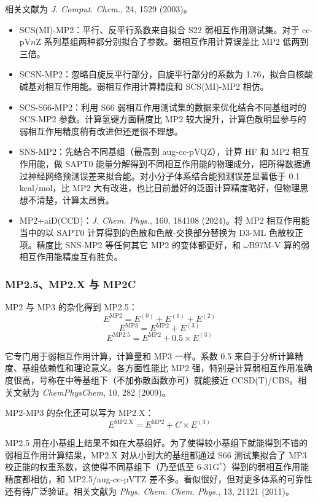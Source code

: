 相关文献为 \textit{J. Comput. Chem.}, 24, 1529 (2003)。

\begin{itemize}
  \item SCS(MI)-MP2：平行、反平行系数来自拟合 S22 弱相互作用测试集。对于 cc-pV$n$Z 系列基组两种都分别拟合了参数。弱相互作用计算误差比 MP2 低两到三倍。
  \item SCSN-MP2：忽略自旋反平行部分，自旋平行部分的系数为 1.76，拟合自核酸碱基对相互作用能。弱相互作用计算精度和 SCS(MI)-MP2 相仿。
  \item SCS-S66-MP2：利用 S66 弱相互作用测试集的数据来优化结合不同基组时的 SCS-MP2 参数。计算氢键方面精度比 MP2 较大提升，计算色散明显参与的弱相互作用精度稍有改进但还是很不理想。
  \item SNS-MP2：先结合不同基组（最高到 aug-cc-pVQZ），计算 HF 和 MP2 相互作用能，做 SAPT0 能量分解得到不同相互作用能的物理成分，把所得数据通过神经网络预测误差来拟合能。对小分子体系结合能预测误差显著低于 0.1 kcal/mol，比 MP2 大有改进，也比目前最好的泛函计算精度略好，但物理思想不清楚，计算太昂贵。
  \item MP2+aiD(CCD)：\textit{J. Chem. Phys.}, 160, 184108 (2024)。将 MP2 相互作用能当中的以 SAPT0 计算得到的色散和色散-交换部分替换为 D3-ML 色散校正项。精度比 SNS-MP2 等任何其它 MP2 的变体都更好，和 $\omega$B97M-V 算的弱相互作用能精度互有胜负。
\end{itemize}

\subsubsection*{MP2.5、MP2.X 与 MP2C}

MP2 与 MP3 的杂化得到 MP2.5：
\[
E^{\mathrm{MP2}}=E^{(0)}+E^{(1)}+E^{(2)}
\]
\[
E^{\mathrm{MP3}}=E^{\mathrm{MP2}}+E^{(3)}
\]
\[
E^{\mathrm{MP2.5}}=E^{\mathrm{MP2}}+0.5\times E^{(3)}
\]

它专门用于弱相互作用计算，计算量和 MP3 一样。系数 0.5 来自于分析计算精度、基组依赖性和理论意义。各方面性能比 MP2 强，特别是计算弱相互作用准确度很高，号称在中等基组下（不加弥散函数亦可）就能接近 CCSD(T)/CBS。相关文献为 \textit{ChemPhysChem}, 10, 282 (2009)。

MP2-MP3 的杂化还可以写为 MP2.X：
\[
E^{\mathrm{MP2.X}}=E^{\mathrm{MP2}}+C\times E^{(3)}
\]

MP2.5 用在小基组上结果不如在大基组好。为了使得较小基组下就能得到不错的弱相互作用计算结果，MP2.X 对从小到大的基组都通过 S66 测试集拟合了 MP3 校正能的权重系数，这使得不同基组下（乃至低至 6-31G$^*$）得到的弱相互作用能精度都相仿，和 MP2.5/aug-cc-pVTZ 差不多。看似很好，但对更多体系的可靠性还有待广泛验证。相关文献为 \textit{Phys. Chem. Chem. Phys.}, 13, 21121 (2011)。

